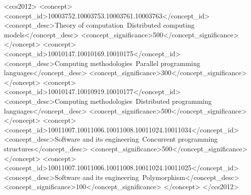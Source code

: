 \documentclass[sigplan,screen,review,anonymous]{acmart}
\begin{document}
\begin{CCSXML}
<ccs2012>
   <concept>
       <concept_id>10003752.10003753.10003761.10003763</concept_id>
       <concept_desc>Theory of computation~Distributed computing models</concept_desc>
       <concept_significance>500</concept_significance>
       </concept>
   <concept>
       <concept_id>10010147.10010169.10010175</concept_id>
       <concept_desc>Computing methodologies~Parallel programming languages</concept_desc>
       <concept_significance>300</concept_significance>
       </concept>
   <concept>
       <concept_id>10010147.10010919.10010177</concept_id>
       <concept_desc>Computing methodologies~Distributed programming languages</concept_desc>
       <concept_significance>500</concept_significance>
       </concept>
   <concept>
       <concept_id>10011007.10011006.10011008.10011024.10011034</concept_id>
       <concept_desc>Software and its engineering~Concurrent programming structures</concept_desc>
       <concept_significance>500</concept_significance>
       </concept>
   <concept>
       <concept_id>10011007.10011006.10011008.10011024.10011025</concept_id>
       <concept_desc>Software and its engineering~Polymorphism</concept_desc>
       <concept_significance>100</concept_significance>
       </concept>
 </ccs2012>
\end{CCSXML}




\maketitle
\end{document}
